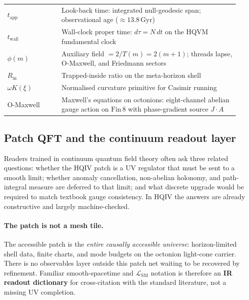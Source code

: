 \documentclass[11pt]{amsart}
\begin{document}
\begin{table}[ht]
\begin{tabular}{p{0.22\linewidth}p{0.72\linewidth}}
    $t_{\mathrm{app}}$ & Look-back time: integrated null-geodesic span; observational age ($\approx 13.8\,\mathrm{Gyr}$) \\
    $t_{\mathrm{wall}}$ & Wall-clock proper time: $d\tau=N\,dt$ on the HQVM fundamental clock \\
    $\phi(m)$ & Auxiliary field $=2/T(m)=2(m+1)$; threads lapse, O-Maxwell, and Friedmann sectors \\
    $R_{\mathrm{in}}$ & Trapped-inside ratio on the meta-horizon shell \\
    $\omega K(\xi)$ & Normalised curvature primitive for Casimir running \\
    O-Maxwell & Maxwell's equations on octonions: eight-channel abelian gauge action on $\mathrm{Fin}\,8$ with phase-gradient source $J\cdot A$ \\
    \bottomrule
  \end{tabular}
\end{table}

\subsection{Patch QFT and the continuum readout layer}
\label{sec:patch-continuum-bridge}

Readers trained in continuum quantum field theory often ask three related questions: whether the HQIV patch is a UV regulator that must be sent to a smooth limit; whether anomaly cancellation, non-abelian holonomy, and path-integral measure are deferred to that limit; and what discrete upgrade would be required to match textbook gauge consistency. In HQIV the answers are already constructive and largely machine-checked.

\paragraph{The patch is not a mesh tile.}
The accessible patch is the \emph{entire causally accessible universe}: horizon-limited shell data, finite charts, and mode budgets on the octonion light-cone carrier. There is no observables layer outside this patch net waiting to be recovered by refinement. Familiar smooth-spacetime and $\mathcal{L}_{\mathrm{SM}}$ notation is therefore an \textbf{IR readout dictionary} for cross-citation with the standard literature, not a missing UV completion.
\end{document}
